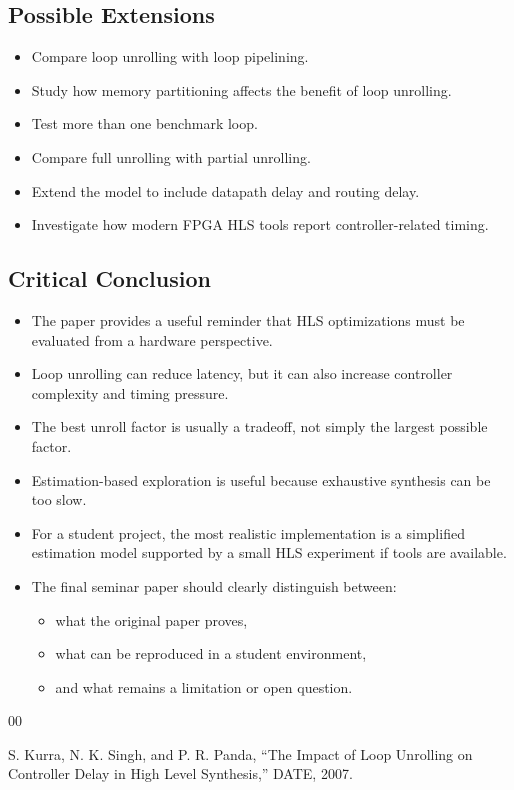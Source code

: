 \documentclass[conference]{IEEEtran}
\begin{document}
\subsection{Possible Extensions}

\begin{itemize}
    \item Compare loop unrolling with loop pipelining.
    \item Study how memory partitioning affects the benefit of loop unrolling.
    \item Test more than one benchmark loop.
    \item Compare full unrolling with partial unrolling.
    \item Extend the model to include datapath delay and routing delay.
    \item Investigate how modern FPGA HLS tools report controller-related timing.
\end{itemize}

\subsection{Critical Conclusion}

\begin{itemize}
    \item The paper provides a useful reminder that HLS optimizations must be evaluated from a hardware perspective.
    \item Loop unrolling can reduce latency, but it can also increase controller complexity and timing pressure.
    \item The best unroll factor is usually a tradeoff, not simply the largest possible factor.
    \item Estimation-based exploration is useful because exhaustive synthesis can be too slow.
    \item For a student project, the most realistic implementation is a simplified estimation model supported by a small HLS experiment if tools are available.
    \item The final seminar paper should clearly distinguish between:
    \begin{itemize}
        \item what the original paper proves,
        \item what can be reproduced in a student environment,
        \item and what remains a limitation or open question.
    \end{itemize}
\end{itemize}

\begin{thebibliography}{00}

S. Kurra, N. K. Singh, and P. R. Panda, ``The Impact of Loop Unrolling on Controller Delay in High Level Synthesis,'' DATE, 2007.

\end{thebibliography}
\end{document}
